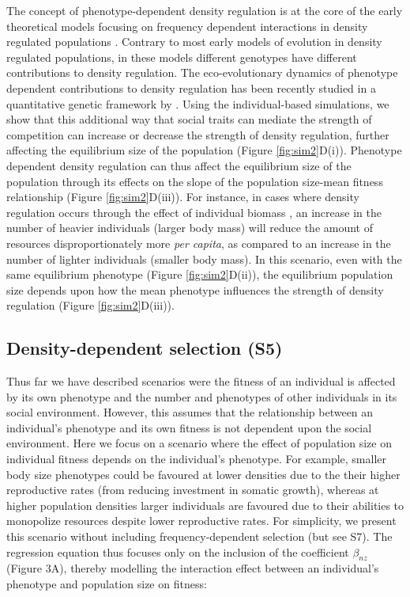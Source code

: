 \documentclass{article}
\begin{document}
The concept of phenotype-dependent density regulation is at the core of the early theoretical models focusing on frequency dependent interactions in density regulated populations \citep{Clarke1972, Anderson1983}. Contrary to most early models of evolution in density regulated populations, in these models different genotypes have different contributions to density regulation. The eco-evolutionary dynamics of phenotype dependent contributions to density regulation has been recently studied in a quantitative genetic framework by \cite{Engen2020}. Using the individual-based simulations, we show that this additional way that social traits can mediate the strength of competition can increase or decrease the strength of density regulation, further affecting the equilibrium size of the population (Figure \ref{fig:sim2}D(i)). Phenotype dependent density regulation can thus affect the equilibrium size of the population through its effects on the slope of the population size-mean fitness relationship (Figure \ref{fig:sim2}D(iii)). For instance, in cases where density regulation occurs through the effect of individual biomass \citep{Owen-Smith2002}, an increase in the number of heavier individuals (larger body mass) will reduce the amount of resources disproportionately more \textit{per capita}, as compared to an increase in the number of lighter individuals (smaller body mass). In this scenario, even with the same equilibrium phenotype (Figure \ref{fig:sim2}D(ii)), the equilibrium population size depends upon how the mean phenotype influences the strength of density regulation (Figure \ref{fig:sim2}D(iii)). 

 \subsection{Density-dependent selection (S5)}
 Thus far we have described scenarios were the fitness of an individual is affected by its own phenotype and the number and phenotypes of other individuals in its social environment. However, this assumes that the relationship between an individual's phenotype and its own fitness is not dependent upon the social environment. Here we focus on a scenario where the effect of population size on individual fitness depends on the individual's phenotype. For example, smaller body size phenotypes could be favoured at lower densities due to the their higher reproductive rates (from reducing investment in somatic growth), whereas at higher population densities larger individuals are favoured due to their abilities to monopolize resources despite lower reproductive rates. For simplicity, we present this scenario without including frequency-dependent selection (but see S7). The regression equation thus focuses only on the inclusion of the coefficient $\beta_{nz}$ (Figure 3A), thereby modelling the interaction effect between an individual's phenotype and population size on fitness:
\end{document}
